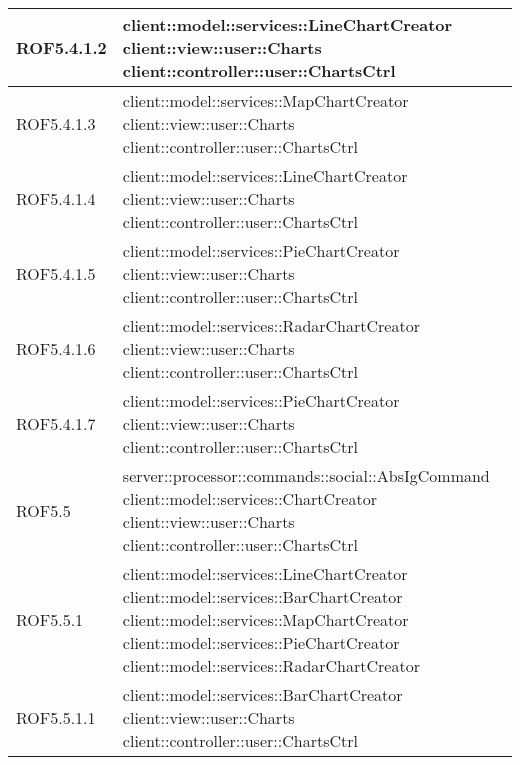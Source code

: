 \begin{center}
\begin{longtable}{| p{2.5cm} | p{11cm} |}
\hline
ROF5.4.1.2 & client::model::services::LineChartCreator \newline client::view::user::Charts \newline client::controller::user::ChartsCtrl \\
\hline
ROF5.4.1.3 & client::model::services::MapChartCreator \newline client::view::user::Charts \newline client::controller::user::ChartsCtrl \\
\hline
ROF5.4.1.4 & client::model::services::LineChartCreator \newline client::view::user::Charts \newline client::controller::user::ChartsCtrl \\
\hline
ROF5.4.1.5 & client::model::services::PieChartCreator \newline client::view::user::Charts \newline client::controller::user::ChartsCtrl \\
\hline
ROF5.4.1.6 & client::model::services::RadarChartCreator \newline client::view::user::Charts \newline client::controller::user::ChartsCtrl \\
\hline
ROF5.4.1.7 & client::model::services::PieChartCreator \newline client::view::user::Charts \newline client::controller::user::ChartsCtrl \\
\hline
ROF5.5 & server::processor::commands::social::AbsIgCommand \newline client::model::services::ChartCreator \newline client::view::user::Charts \newline client::controller::user::ChartsCtrl \\
\hline
ROF5.5.1 & client::model::services::LineChartCreator \newline client::model::services::BarChartCreator \newline client::model::services::MapChartCreator \newline client::model::services::PieChartCreator \newline client::model::services::RadarChartCreator \\
\hline
ROF5.5.1.1 & client::model::services::BarChartCreator \newline client::view::user::Charts \newline client::controller::user::ChartsCtrl \\

\end{longtable}
\end{center}
